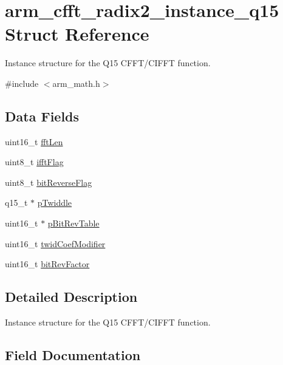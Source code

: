 \hypertarget{structarm__cfft__radix2__instance__q15}{}\section{arm\+\_\+cfft\+\_\+radix2\+\_\+instance\+\_\+q15 Struct Reference}
\label{structarm__cfft__radix2__instance__q15}


Instance structure for the Q15 C\+F\+F\+T/\+C\+I\+F\+FT function.  




{\ttfamily \#include $<$arm\+\_\+math.\+h$>$}

\subsection*{Data Fields}
\begin{DoxyCompactItemize}
\item 
uint16\+\_\+t \hyperlink{structarm__cfft__radix2__instance__q15_ab8db3bbe7c61e6bb8ca2a55e3446e11a}{fft\+Len}
\item 
uint8\+\_\+t \hyperlink{structarm__cfft__radix2__instance__q15_ad6ca6e223f986ebfd94c5ee1e410aa73}{ifft\+Flag}
\item 
uint8\+\_\+t \hyperlink{structarm__cfft__radix2__instance__q15_a09a221a818c6d0e064557a99e2fe9a8b}{bit\+Reverse\+Flag}
\item 
q15\+\_\+t $\ast$ \hyperlink{structarm__cfft__radix2__instance__q15_aa8c837c05b2c910342ab8f171d30dc02}{p\+Twiddle}
\item 
uint16\+\_\+t $\ast$ \hyperlink{structarm__cfft__radix2__instance__q15_a46a2fb328199897af100fea0bfdf59aa}{p\+Bit\+Rev\+Table}
\item 
uint16\+\_\+t \hyperlink{structarm__cfft__radix2__instance__q15_afe772e5b5001c9d8e85032115a8df5bf}{twid\+Coef\+Modifier}
\item 
uint16\+\_\+t \hyperlink{structarm__cfft__radix2__instance__q15_a33386d95319dc3ee7097b3a8e52e01ec}{bit\+Rev\+Factor}
\end{DoxyCompactItemize}


\subsection{Detailed Description}
Instance structure for the Q15 C\+F\+F\+T/\+C\+I\+F\+FT function. 

\subsection{Field Documentation}
\mbox{\label{structarm__cfft__radix2__instance__q15_a09a221a818c6d0e064557a99e2fe9a8b}} 

